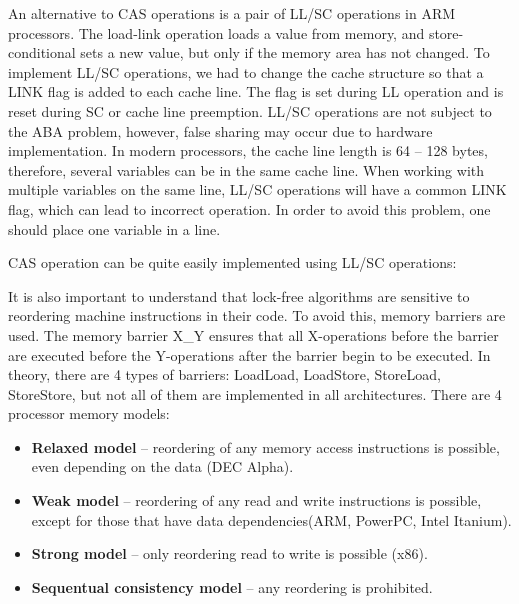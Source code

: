 {\begin{figure}[H]
	\end{figure}
	\par An alternative to CAS operations is a pair of LL/SC operations in ARM processors. The load-link operation loads a value from memory, and store-conditional sets a new value, but only if the memory area has not changed. To implement LL/SC operations, we had to change the cache structure so that a LINK flag is added to each cache line. The flag is set during LL operation and is reset during SC or cache line preemption. LL/SC operations are not subject to the ABA problem, however, false sharing may occur due to hardware implementation. In modern processors, the cache line length is 64 – 128 bytes, therefore, several variables can be in the same cache line. When working with multiple variables on the same line, LL/SC operations will have a common LINK flag, which can lead to incorrect operation. In order to avoid this problem, one should place one variable in a line.
	\begin{figure}[H]
		
	\end{figure}
	\par CAS operation can be quite easily implemented using LL/SC operations:
	\begin{figure}[H]
		
	\end{figure}
	\par It is also important to understand that lock-free algorithms are sensitive to reordering machine instructions in their code. To avoid this, memory barriers are used. The memory barrier X\_Y ensures that all X-operations before the barrier are executed before the Y-operations after the barrier begin to be executed. In theory, there are 4 types of barriers: LoadLoad, LoadStore, StoreLoad, StoreStore, but not all of them are implemented in all architectures. There are 4 processor memory models:
	\begin{itemize}  
		\item\textbf{Relaxed model} -- reordering of any memory access instructions is possible, even depending on the data (DEC Alpha).
		\item\textbf{Weak model} -- reordering of any read and write instructions is possible, except for those that have data dependencies(ARM, PowerPC, Intel Itanium).
		\item\textbf{Strong model } -- only reordering read to write is possible (x86).
		\item\textbf{Sequentual consistency model} -- any reordering is prohibited.

\end{itemize}}
